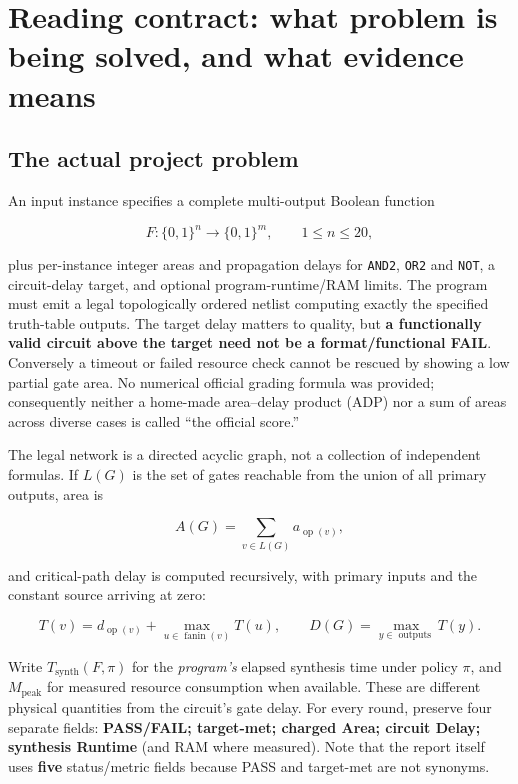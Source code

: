 \section{Reading contract: what problem is being solved, and what evidence means}\label{reading-contract-what-problem-is-being-solved-and-what-evidence-means}

\subsection{The actual project problem}\label{the-actual-project-problem}

An input instance specifies a complete multi-output Boolean function

\[
F:\{0,1\}^{n}\to\{0,1\}^{m},\qquad 1\le n\le20,
\]

plus per-instance integer areas and propagation delays for \texttt{AND2}, \texttt{OR2} and \texttt{NOT}, a circuit-delay target, and optional program-runtime/RAM limits. The program must emit a legal topologically ordered netlist computing exactly the specified truth-table outputs. The target delay matters to quality, but \textbf{a functionally valid circuit above the target need not be a format/functional FAIL}. Conversely a timeout or failed resource check cannot be rescued by showing a low partial gate area. No numerical official grading formula was provided; consequently neither a home-made area--delay product (ADP) nor a sum of areas across diverse cases is called ``the official score.''

The legal network is a directed acyclic graph, not a collection of independent formulas. If \(L(G)\) is the set of gates reachable from the union of all primary outputs, area is

\[
A(G)=\sum_{v\in L(G)} a_{\operatorname{op}(v)},
\]

and critical-path delay is computed recursively, with primary inputs and the constant source arriving at zero:

\[
T(v)=d_{\operatorname{op}(v)}+\max_{u\in\operatorname{fanin}(v)}T(u),
\qquad D(G)=\max_{y\in\operatorname{outputs}}T(y).
\]

Write \(T_{\mathrm{synth}}(F,\pi)\) for the \emph{program's} elapsed synthesis time under policy \(\pi\), and \(M_{\mathrm{peak}}\) for measured resource consumption when available. These are different physical quantities from the circuit's gate delay. For every round, preserve four separate fields: \textbf{PASS/FAIL; target-met; charged Area; circuit Delay; synthesis Runtime} (and RAM where measured). Note that the report itself uses \textbf{five} status/metric fields because PASS and target-met are not synonyms.

